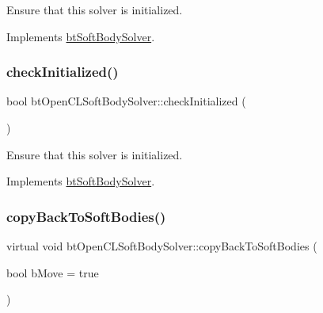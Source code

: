 Ensure that this solver is initialized. 

Implements \hyperlink{classbtSoftBodySolver_aae0adf7ffc11cd7fafec927a54c654d5}{bt\+Soft\+Body\+Solver}.

\mbox{\label{classbtOpenCLSoftBodySolver_a7cafc88f5845c099ce33fb6c5b84968e}} 
\subsubsection{\texorpdfstring{check\+Initialized()}{checkInitialized()}\hspace{0.1cm}{\footnotesize\ttfamily [2/2]}}
{\footnotesize\ttfamily bool bt\+Open\+C\+L\+Soft\+Body\+Solver\+::check\+Initialized (\begin{DoxyParamCaption}{ }\end{DoxyParamCaption})\hspace{0.3cm}{\ttfamily [virtual]}}

Ensure that this solver is initialized. 

Implements \hyperlink{classbtSoftBodySolver_aae0adf7ffc11cd7fafec927a54c654d5}{bt\+Soft\+Body\+Solver}.

\mbox{\label{classbtOpenCLSoftBodySolver_a374b440216ba03aa39db58e23280c08c}} 
\subsubsection{\texorpdfstring{copy\+Back\+To\+Soft\+Bodies()}{copyBackToSoftBodies()}\hspace{0.1cm}{\footnotesize\ttfamily [1/2]}}
{\footnotesize\ttfamily virtual void bt\+Open\+C\+L\+Soft\+Body\+Solver\+::copy\+Back\+To\+Soft\+Bodies (\begin{DoxyParamCaption}\item[{bool}]{b\+Move = {\ttfamily true} }\end{DoxyParamCaption})\hspace{0.3cm}{\ttfamily [virtual]}}

